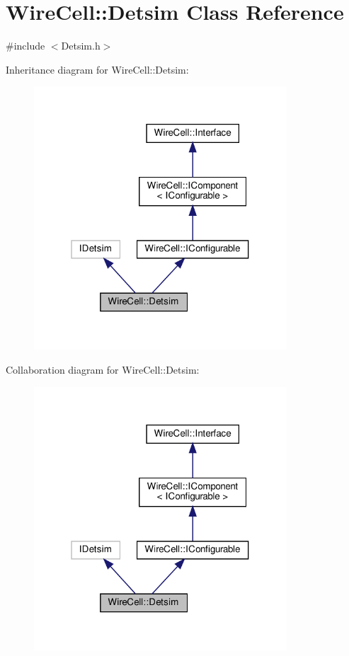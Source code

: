 \hypertarget{class_wire_cell_1_1_detsim}{}\section{Wire\+Cell\+:\+:Detsim Class Reference}
\label{class_wire_cell_1_1_detsim}


{\ttfamily \#include $<$Detsim.\+h$>$}



Inheritance diagram for Wire\+Cell\+:\+:Detsim\+:
\nopagebreak
\begin{figure}[H]
\begin{center}
\leavevmode
\includegraphics[width=268pt]{class_wire_cell_1_1_detsim__inherit__graph}
\end{center}
\end{figure}


Collaboration diagram for Wire\+Cell\+:\+:Detsim\+:
\nopagebreak
\begin{figure}[H]
\begin{center}
\leavevmode
\includegraphics[width=268pt]{class_wire_cell_1_1_detsim__coll__graph}
\end{center}
\end{figure}
